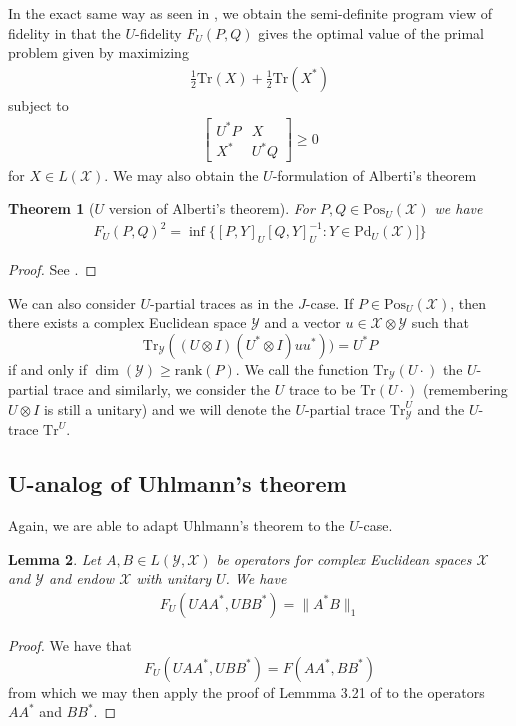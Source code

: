 \documentclass{amsart}
\numberwithin{equation}{section}
\newtheorem{theorem}{Theorem}[section]
\newtheorem{lemma}[theorem]{Lemma}
\theoremstyle{definition}
\theoremstyle{plain}
\theoremstyle{solutionstyle}
\begin{document}
In the exact same way as seen in \cite[p.~147]{Watrous_2018}, we obtain the semi-definite program view of fidelity in that the $U$-fidelity $F_U(P,Q)$ gives the optimal value of the primal problem given by maximizing 
 \begin{align*}
     \frac{1}{2}\mathrm{Tr}(X)+\frac{1}{2}\mathrm{Tr}(X^*)
 \end{align*}
 subject to 
 \begin{align*}
     \begin{bmatrix}
        U^*P & X \\
        X^{*} & U^*Q
    \end{bmatrix}\geq 0
 \end{align*} for $X\in L(\mathcal{X})$.
We may also obtain the $U$-formulation of Alberti's theorem
\begin{theorem}[$U$ version of Alberti's theorem]
    For $P,Q\in \mathrm{Pos}_U(\mathcal{X})$ we have 
    \begin{align*}
        F_U(P,Q)^2=\inf\{ [P, Y]_U[Q,Y]_U^{-1}: Y\in \mathrm{Pd}_U(\mathcal{X})]\}
    \end{align*}
\end{theorem}
\begin{proof}
    See \cite[pp.~148--149]{Watrous_2018}.
\end{proof}

We can also consider $U$-partial traces as in the $J$-case. If $P\in \mathrm{Pos}_U(\mathcal{X})$, then there exists a complex Euclidean space $\mathcal{Y}$ and a vector $u\in \mathcal{X}\otimes \mathcal{Y}$ such that \begin{equation*}\mathrm{Tr}_{\mathcal{Y}}((U\otimes I)(U^*\otimes I)uu^*))=U^*P\end{equation*} if and only if $\dim(\mathcal{Y})\geq \mathrm{rank}(P)$. We call the function $\mathrm{Tr}_{\mathcal{Y}}(U\cdot)$ the $U$-partial trace and similarly, we consider the $U$ trace to be $\mathrm{Tr}(U\cdot)$ (remembering $U\otimes I$ is still a unitary) and we will denote the $U$-partial trace $\mathrm{Tr}^U_{\mathcal{Y}}$ and the $U$-trace $\mathrm{Tr}^U$. 

\subsection{U-analog of Uhlmann's theorem}
Again, we are able to adapt Uhlmann's theorem to the $U$-case. 
\begin{lemma}
    Let $A,B\in L(\mathcal{Y},\mathcal{X})$ be operators for complex Euclidean spaces $\mathcal{X}$ and $\mathcal{Y}$ and endow $\mathcal{X}$ with unitary $U$. We have 
    \begin{align*}
        F_U(UAA^*,UBB^*)=\|A^*B\|_1
    \end{align*}
\end{lemma}
\begin{proof} We have that 
    \begin{equation*}
    F_U(UAA^*,UBB^*)=F(AA^*,BB^*)
    \end{equation*}
    from which we may then apply the proof of Lemmma 3.21 of \cite{Watrous_2018} to the operators $AA^*$ and $BB^*$.
\end{proof}
\end{document}
